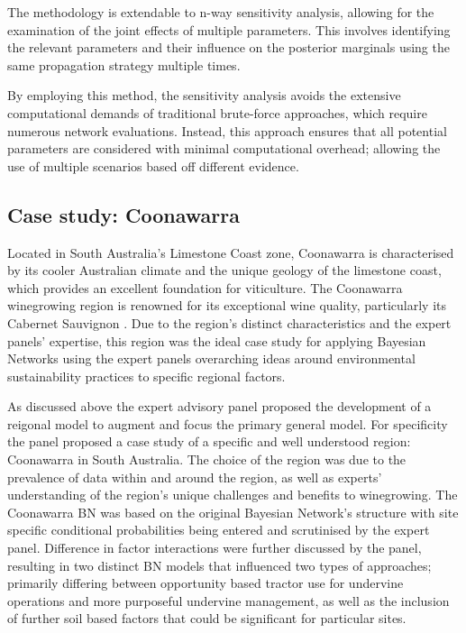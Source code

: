 


The methodology is extendable to n-way sensitivity analysis, allowing for the examination of the joint effects of multiple parameters. This involves identifying the relevant parameters and their influence on the posterior marginals using the same propagation strategy multiple times.

By employing this method, the sensitivity analysis avoids the extensive computational demands of traditional brute-force approaches, which require numerous network evaluations. Instead, this approach ensures that all potential parameters are considered with minimal computational overhead; allowing the use of multiple scenarios based off different evidence.

\subsection{Case study: Coonawarra}

Located in South Australia's Limestone Coast zone, Coonawarra is characterised by its cooler Australian climate and the unique geology of the limestone coast, which provides an excellent foundation for viticulture. The Coonawarra winegrowing region is renowned for its exceptional wine quality, particularly its Cabernet Sauvignon \cite{hallidayAustralianWineEncyclopedia2009}. Due to the region's distinct characteristics and the expert panels' expertise, this region was the ideal case study for applying Bayesian Networks using the expert panels overarching ideas around environmental sustainability practices to specific regional factors.

As discussed above the expert advisory panel proposed the development of a reigonal model to augment and focus the primary general model. For specificity the panel proposed a case study of a specific and well understood region: Coonawarra in South Australia. The choice of the region was due to the prevalence of data within and around the region, as well as experts' understanding of the region's unique challenges and benefits to winegrowing. The Coonawarra BN was based on the original Bayesian Network's structure with site specific conditional probabilities being entered and scrutinised by the expert panel. Difference in factor interactions were further discussed by the panel, resulting in two distinct BN models that influenced two types of approaches; primarily differing between opportunity based tractor use for undervine operations and more purposeful undervine management, as well as the inclusion of further soil based factors that could be significant for particular sites.

